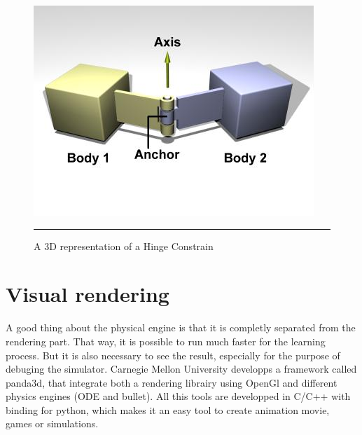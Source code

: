 \begin{figure}[htbp]
    \centering
    \includegraphics{Figures/hinge.jpg}
    \rule{35em}{0.5pt}
    \caption[A Hinge Constraint]{A 3D representation of a Hinge Constrain}
    \label{fig:Hinge}
\end{figure}

\section{Visual rendering}
A good thing about the physical engine is that it is completly separated from the rendering part. That way, it is possible to run much faster for the learning process. But it is also necessary to see the result, especially for the purpose of debuging the simulator. Carnegie Mellon University developps a framework called panda3d, that integrate both a rendering librairy using OpenGl and different physics engines (ODE and bullet). All this tools are developped in C/C++ with binding for python, which makes it an easy tool to create animation movie, games or simulations.

